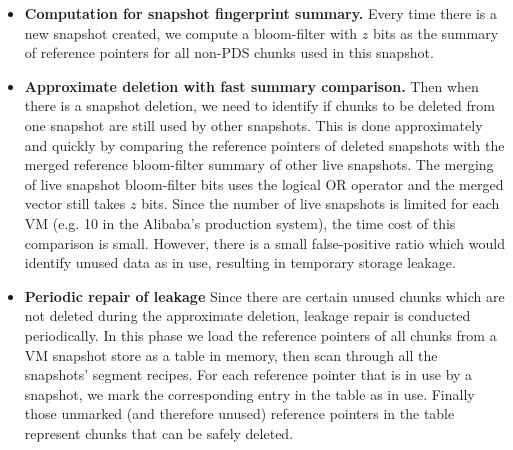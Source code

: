 \begin{itemize}
\item {\bf Computation for snapshot fingerprint summary.}
Every time there is a new snapshot created,
we compute a bloom-filter with $z$ bits as the summary of reference pointers for all non-PDS chunks used 
in this snapshot. 



\item {\bf Approximate deletion with fast summary comparison.}
Then when there is a snapshot deletion,  
we need to identify if  chunks to be deleted from one snapshot
are still used by other snapshots. 
This is done approximately and quickly by comparing the reference pointers of deleted snapshots with
the merged reference bloom-filter summary of other live snapshots.
The merging of live snapshot bloom-filter bits uses the logical OR operator and the merged vector still takes $z$ bits.
Since the number of live snapshots is limited for each VM (e.g. 10 in the Alibaba's production system), 
the time cost of this comparison is small.
However, there is a small false-positive ratio which
would identify unused data as in use, resulting in temporary storage leakage.


\item {\bf Periodic repair of leakage}
Since there are certain unused chunks which are not deleted during
the approximate deletion, leakage repair is conducted periodically.
In this phase we load the reference pointers of all chunks from a VM snapshot store as a table in memory,
then scan through all the snapshots' segment recipes. For each reference pointer that is in use by a snapshot,
we mark the corresponding entry in the table as in use. Finally those unmarked (and therefore unused) reference pointers in the
table represent chunks that can be safely deleted.


\end{itemize}
